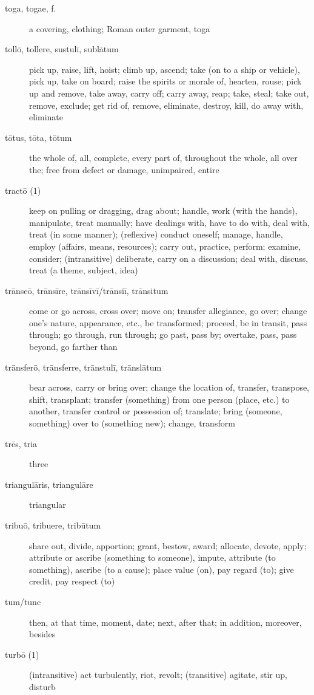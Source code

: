 \begin{description}
    \item[toga, togae, f.] a covering, clothing; Roman outer garment, toga
    \item[tollō, tollere, sustulī, sublātum] \marginnote{*}pick up, raise, lift, hoist; climb up, ascend; take (on to a ship or vehicle), pick up, take on board; raise the spirits or morale of, hearten, rouse; pick up and remove, take away, carry off; carry away, reap; take, steal; take out, remove, exclude; get rid of, remove, eliminate, destroy, kill, do away with, eliminate
    \item[tōtus, tōta, tōtum] \marginnote{*}the whole of, all, complete, every part of, throughout the whole, all over the; free from defect or damage, unimpaired, entire
    \item[tractō (1)] keep on pulling or dragging, drag about; handle, work (with the hands), manipulate, treat manually; have dealings with, have to do with, deal with, treat (in some manner); (reflexive) conduct oneself; manage, handle, employ (affairs, means, resources); carry out, practice, perform; examine, consider; (intransitive) deliberate, carry on a discussion; deal with, discuss, treat (a theme, subject, idea)
    \item[trānseō, trānsīre, trānsīvī/trānsiī, trānsitum] \marginnote{*}come or go across, cross over; move on; transfer allegiance, go over; change one's nature, appearance, etc., be transformed; proceed, be in transit, pass through; go through, run through; go past, pass by; overtake, pass, pass beyond, go farther than
    \item[trānsferō, trānsferre, trānstulī, trānslātum] bear across, carry or bring over; change the location of, transfer, transpose, shift, transplant; transfer (something) from one person (place, etc.) to another, transfer control or possession of; translate; bring (someone, something) over to (something new); change, transform
    \item[trēs, tria] \marginnote{*}three
    \item[triangulāris, triangulāre] triangular
    \item[tribuō, tribuere, tribūtum] share out, divide, apportion; grant, bestow, award; allocate, devote, apply; attribute or ascribe (something to someone), impute, attribute (to something), ascribe (to a cause); place value (on), pay regard (to); give credit, pay respect (to)
    \item[tum/tunc] \marginnote{*}then, at that time, moment, date; next, after that; in addition, moreover, besides
    \item[turbō (1)] \marginnote{*}(intransitive) act turbulently, riot, revolt; (transitive) agitate, stir up, disturb

\end{description}
